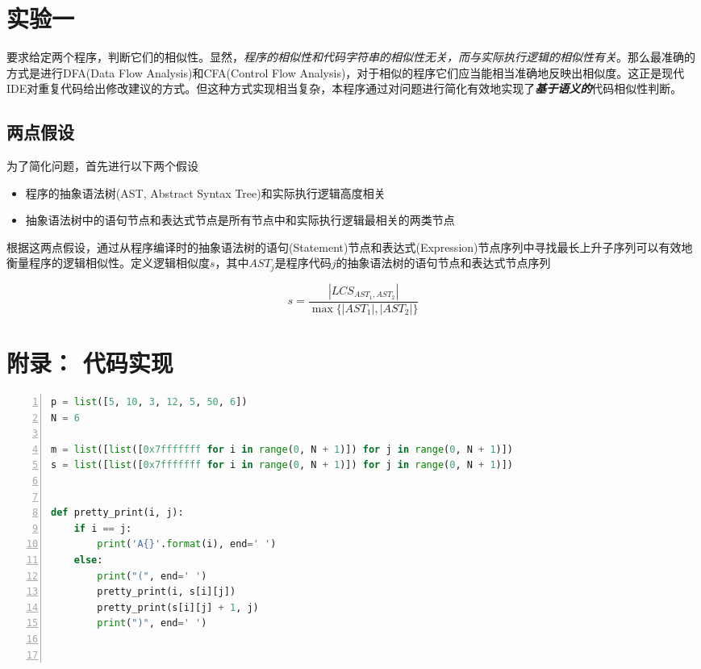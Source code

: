 \documentclass[a4paper,twoside]{article}
\begin{document}
\begin{spacing}{1.2}
\newpage

\section{实验一}

要求给定两个程序，判断它们的相似性。显然，\emph{程序的相似性和代码字符串的相似性无关，而与实际执行逻辑的相似性有关}。那么最准确的方式是进行DFA(Data Flow Analysis)和CFA(Control Flow Analysis)，对于相似的程序它们应当能相当准确地反映出相似度。这正是现代IDE对重复代码给出修改建议的方式。但这种方式实现相当复杂，本程序通过对问题进行简化有效地实现了\emph{\textbf{基于语义的}}代码相似性判断。

\subsection{两点假设}
为了简化问题，首先进行以下两个假设

\begin{itemize}
	\item 程序的抽象语法树(AST, Abstract Syntax Tree)和实际执行逻辑高度相关
	\item 抽象语法树中的语句节点和表达式节点是所有节点中和实际执行逻辑最相关的两类节点
\end{itemize}

根据这两点假设，通过从程序编译时的抽象语法树的语句(Statement)节点和表达式(Expression)节点序列中寻找最长上升子序列可以有效地衡量程序的逻辑相似性。定义逻辑相似度$s$，其中$AST_j$是程序代码$j$的抽象语法树的语句节点和表达式节点序列

$$
s=\frac{|LCS_{AST_1,AST_2}|}{\mathop{\max}\{|AST_1|,|AST_2|\}}
$$

\clearpage
\appendix

\section{附录： 代码实现}
\label{sec:app_impl}


\begin{lstlisting}[language=Python,numbers=left,style=PythonStyle,caption=矩阵连乘,label={code:implmat}]
p = list([5, 10, 3, 12, 5, 50, 6])
N = 6

m = list([list([0x7fffffff for i in range(0, N + 1)]) for j in range(0, N + 1)])
s = list([list([0x7fffffff for i in range(0, N + 1)]) for j in range(0, N + 1)])


def pretty_print(i, j):
    if i == j:
        print('A{}'.format(i), end=' ')
    else:
        print("(", end=' ')
        pretty_print(i, s[i][j])
        pretty_print(s[i][j] + 1, j)
        print(")", end=' ')



\end{lstlisting}
\end{spacing}
\end{document}
